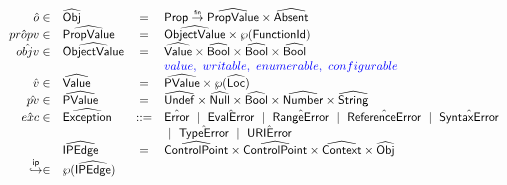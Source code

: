 \[\begin{array}{rlcl}
\hat{o} \in & \aObj & = & \SF{Prop} \finto \abs{PropValue} \times \abs{Absent} \\
\hat{propv} \in & \abs{PropValue} & = & \abs{ObjectValue} \times \powerset{\fid} \\
\hat{objv} \in & \abs{ObjectValue} & = & 
    \aValue \times \abs{Bool} \times \abs{Bool} \times \abs{Bool} \\
    & & & {\inblue value,\ writable,\ enumerable,\ configurable} \\
\hat{v} \in & \aValue & = & \abs{PValue} \times \powerset{\aLoc} \\
\hat{pv}\in & \abs{PValue} & = & 
    \abs{Undef} \times \abs{Null} \times \abs{Bool} \times \abs{Number} \times \abs{String} \\
\hat{exc}\in& \abs{Exception} & ::= & \hat{\exc{Error}} ~\mid~ 
                                      \hat{\exc{EvalError}} ~\mid~
                                      \hat{\exc{RangeError}} ~\mid~
                                      \hat{\exc{ReferenceError}} ~\mid~
                                      \hat{\exc{SyntaxError}} \\
                                & & & ~\mid~
                                      \hat{\exc{TypeError}} ~\mid~ 
                                      \hat{\exc{URIError}} \\
    & \abs{IPEdge} & = & 
        \aControlPoint \times \aControlPoint \times \abs{Context} \times \abs{Obj} \\
\ipnext \in & \powerset{\abs{IPEdge}} & &\\

\end{array}
\]

